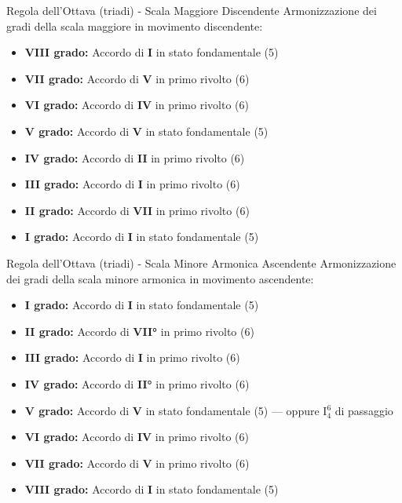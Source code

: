 \begin{regola}{Regola dell'Ottava (triadi) - Scala Maggiore Discendente}
	\label{reg:regola_ottava_maggiore_disc}
	Armonizzazione dei gradi della scala maggiore in movimento discendente:
	
	\begin{itemize}
		\item \textbf{VIII grado:} Accordo di \textbf{I} in stato fondamentale (5)
		\item \textbf{VII grado:} Accordo di \textbf{V} in primo rivolto (6)
		\item \textbf{VI grado:} Accordo di \textbf{IV} in primo rivolto (6)
		\item \textbf{V grado:} Accordo di \textbf{V} in stato fondamentale (5)
		\item \textbf{IV grado:} Accordo di \textbf{II} in primo rivolto (6)
		\item \textbf{III grado:} Accordo di \textbf{I} in primo rivolto (6)
		\item \textbf{II grado:} Accordo di \textbf{VII} in primo rivolto (6)
		\item \textbf{I grado:} Accordo di \textbf{I} in stato fondamentale (5)
	\end{itemize}
\end{regola}



\begin{regola}{Regola dell'Ottava (triadi) - Scala Minore Armonica Ascendente}
	\label{reg:regola_ottava_minore_asc}
	Armonizzazione dei gradi della scala minore armonica in movimento ascendente:
	
	\begin{itemize}
		\item \textbf{I grado:} Accordo di \textbf{I} in stato fondamentale (5)
		\item \textbf{II grado:} Accordo di \textbf{VII°} in primo rivolto (6)
		\item \textbf{III grado:} Accordo di \textbf{I} in primo rivolto (6)
		\item \textbf{IV grado:} Accordo di \textbf{II°} in primo rivolto (6)
		\item \textbf{V grado:} Accordo di \textbf{V} in stato fondamentale (5) — oppure I$^6_4$ di passaggio
		\item \textbf{VI grado:} Accordo di \textbf{IV} in primo rivolto (6)
		\item \textbf{VII grado:} Accordo di \textbf{V} in primo rivolto (6)
		\item \textbf{VIII grado:} Accordo di \textbf{I} in stato fondamentale (5)
	\end{itemize}
\end{regola}



